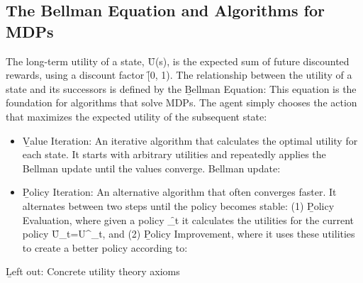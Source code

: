 \subsection{The Bellman Equation and Algorithms for MDPs}
The long-term utility of a state, \f{U(s)}, is the expected sum of future discounted rewards, using a discount factor \f{\gamma \in [0, 1)}. The relationship between the utility of a state and its successors is defined by the \b{Bellman Equation}:
This equation is the foundation for algorithms that solve MDPs. The agent simply chooses the action that maximizes the expected utility of the subsequent state:
\begin{itemize}
    \item \b{Value Iteration:} An iterative algorithm that calculates the optimal utility for each state. It starts with arbitrary utilities and repeatedly applies the Bellman update until the values converge. Bellman update:
    \item \b{Policy Iteration:} An alternative algorithm that often converges faster. It alternates between two steps until the policy becomes stable: (1) \b{Policy Evaluation}, where given a policy \f{\pi_t} it calculates the utilities for the current policy \f{U_t=U^{\pi_t}}, and (2) \b{Policy Improvement}, where it uses these utilities to create a better policy according to:
\end{itemize}
\vspace{0.5cm}
\b{Left out:} Concrete utility theory axioms
\newpage